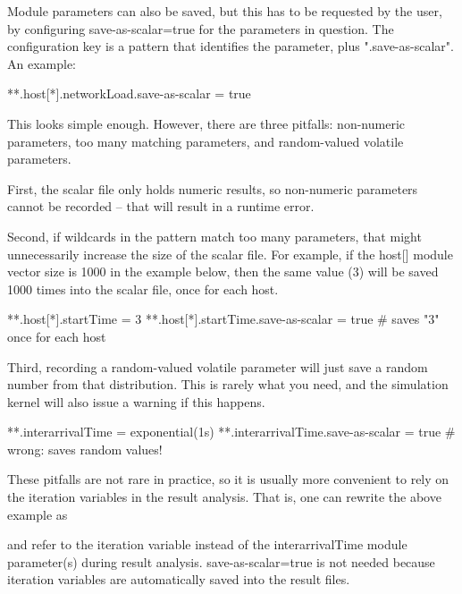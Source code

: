 Module parameters can also be saved, but this has to be
requested by the user, by configuring save-as-scalar=true for the
parameters in question. The configuration key is a pattern that
identifies the parameter, plus ".save-as-scalar". An example:

\begin{inifile}
**.host[*].networkLoad.save-as-scalar = true
\end{inifile}

This looks simple enough. However, there are three pitfalls:
non-numeric parameters, too many matching parameters, and
random-valued volatile parameters.

First, the scalar file only holds numeric results, so non-numeric
parameters cannot be recorded -- that will result in a runtime
error.

Second, if wildcards in the pattern match too many parameters, that
might unnecessarily increase the size of the scalar file. For example,
if the host[] module vector size is 1000 in the example below, then the
same value (3) will be saved 1000 times into the scalar file, once for
each host.

\begin{inifile}
**.host[*].startTime = 3
**.host[*].startTime.save-as-scalar = true  # saves "3" once for each host
\end{inifile}

Third, recording a random-valued volatile parameter will just save a
random number from that distribution. This is rarely what you need, and
the simulation kernel will also issue a warning if this happens.

\begin{inifile}
**.interarrivalTime = exponential(1s)
**.interarrivalTime.save-as-scalar = true  # wrong: saves random values!
\end{inifile}


These pitfalls are not rare in practice, so it is usually more
convenient to rely on the iteration variables in the result analysis.
That is, one can rewrite the above example as


and refer to the  iteration variable instead of the
interarrivalTime module parameter(s) during result analysis.
save-as-scalar=true is not needed because iteration variables are
automatically saved into the result files.



